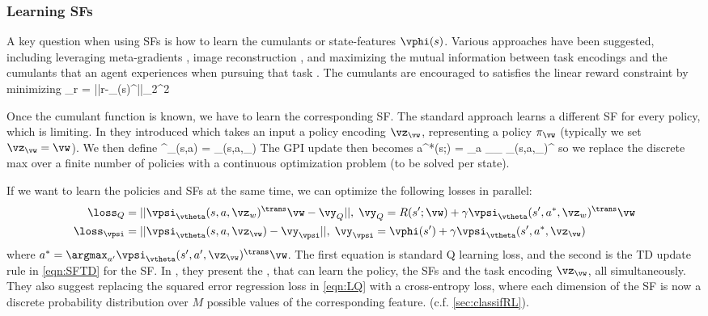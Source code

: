 \subsubsection{Learning SFs}

A key question when using SFs is how to learn the cumulants
or state-features
$\vphi(s)$.
Various approaches have been suggested,
including leveraging meta-gradients \citep{Veeriah2019},
image reconstruction \citep{Machado2018eigen},
and
maximizing the mutual information between task encodings
and the cumulants that an agent experiences when pursuing that task
\citep{Hansen2019}.
The cumulants are encouraged to satisfies the linear reward
constraint by minimizing
\be
\loss_r = ||r-\vphi_{\vtheta}(s)^\trans \vw||_2^2
\ee

Once the cumulant function is known,
we have to learn the corresponding SF.
The standard approach learns a different SF for every policy,
which is limiting. In \citep{Borsa2019} they introduced
which takes an input a policy encoding $\vz_{\vw}$,
representing a policy $\pi_{\vw}$ (typically we set $\vz_{\vw}=\vw$).
We then define
\be
\vpsi^{\pi_{\vw}}(s,a) = \vpsi_{\vtheta}(s,a,\vz_{\vw})
\ee
The GPI update then becomes
\be
a^*(s;\wnew) = \argmax_a \max_{\vz_{\vw}} \vpsi_{\vtheta}(s,a,\vz_{\vw})^\trans \wnew
\ee
so we replace the discrete max over a finite number of policies
with a continuous optimization problem (to be solved per state).

If we want to learn the policies and SFs at the same time,
we can optimize the following losses in parallel:
\begin{align}
  \loss_Q &= ||\vpsi_{\vtheta}(s,a,\vz_w)^\trans \vw - \vy_Q||,
  \;
  \vy_Q = R(s';\vw) + \gamma \vpsi_{\vtheta}(s',a^*,\vz_w)^\trans \vw
  \label{eqn:LQ} \\
  \loss_{\vpsi} &= ||\vpsi_{\vtheta}(s,a,\vz_{\vw}) - \vy_{\vpsi}||,
  \;
  \vy_{\vpsi} = \vphi(s') + \gamma \vpsi_{\vtheta}(s',a^*,\vz_{\vw})
\end{align}
where $a^* = \argmax_{a'} \vpsi_{\vtheta}(s', a', \vz_{\vw})^\trans \vw$.
The first equation is standard Q learning loss,
and the second is the TD update rule
in \cref{eqn:SFTD} for the SF.
In \citep{Carvalho2023}, they present the
,
that can learn the policy,
the SFs 
and the task encoding $\vz_{\vw}$,
all simultaneously.
They also suggest replacing the squared error regression
loss in \cref{eqn:LQ} with a cross-entropy loss,
where each dimension of the SF is now a
discrete probability distribution
over $M$ possible values of the corresponding feature.
(c.f. \cref{sec:classifRL}).


